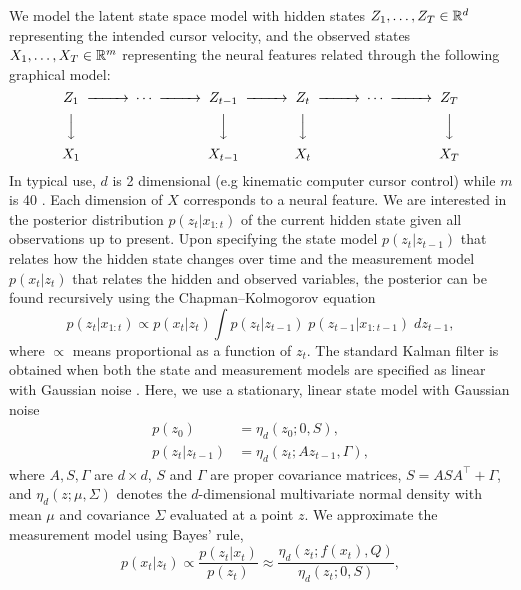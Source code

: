 We model the latent state space model with hidden states $Z_1,\dotsc,Z_T \in \mathbb{R}^d$ representing the intended cursor velocity, and the observed states $X_1,\dotsc,X_T \in \mathbb{R}^m$ representing the neural features related through the following graphical model:
\[
\begin{CD}
Z_1 @>>> \cdots @>>>  Z_{t-1} @>>> Z_t @>>> \cdots  @>>> Z_T \\
@VVV @.	@VVV @VVV @. @VVV \\
X_1  @. @. X_{t-1} @. X_t @. @. X_T
\end{CD}
\]
In typical use, $d$ is 2 dimensional (e.g kinematic computer cursor control) while $m$ is 40 \cite{Jarosiewicz2013, Jarosiewicz2015, Bacher2015, Brandman2018}.  Each dimension of $X$ corresponds to a neural feature. We are interested in the posterior distribution $p(z_t|x_{1:t})$ of the current hidden state given all observations up to present. Upon specifying the state model $p(z_t|z_{t-1})$ that relates how the hidden state changes over time and the measurement model $p(x_t|z_t)$ that relates the hidden and observed variables, the posterior can be found recursively using the Chapman--Kolmogorov equation
\begin{equation}
\label{e:chapman_kolmogorov}
p(z_t|x_{1:t}) \propto p(x_t|z_t) \int p(z_t|z_{t-1}) \; p(z_{t-1}|x_{1:t-1})\; dz_{t-1},
\end{equation}
where $\propto$ means proportional as a function of $z_t$. The standard Kalman filter is obtained when both the state and measurement models are specified as linear with Gaussian noise \cite{Wu2005, Simeral2011}.  Here, we use a stationary, linear state model with Gaussian noise 
\begin{subequations} \label{e:statemodel}
\begin{align}
 p(z_0) & = \eta_d(z_0;0,S), \\ 
 p(z_t|z_{t-1}) & = \eta_d(z_t;Az_{t-1},\Gamma),
\end{align}
\end{subequations}
where $A,S,\Gamma$ are $d\!\times\!d$, $S$ and $\Gamma$ are proper covariance matrices, $S=ASA^\intercal+\Gamma$, and $\eta_d(z; \mu, \Sigma)$ denotes the $d$-dimensional multivariate normal density with mean $\mu$ and covariance $\Sigma$ evaluated at a point $z$. We approximate the measurement model using Bayes' rule,
\begin{equation}
\label{e:measurement_model}
p(x_t|z_t) 
\propto \frac{p(z_t|x_t)}{p(z_t)}
\approx \frac{\eta_d(z_t; f(x_t), Q)}{\eta_d(z_t; 0, S)},
\end{equation}
